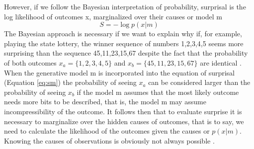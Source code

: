 \documentclass[11pt, onecolumn]{article}
\begin{document}
However, if we follow the Bayesian interpretation of probability, surprisal is the log likelihood of outcomes x,  marginalized over their causes or model m
\begin{equation}
S = -\log p(x|m)
\label{eq:sm}
\end{equation}
The Bayesian approach is necessary if we want to explain why if, for example, playing the state lottery, the winner sequence of numbers 1,2,3,4,5 seems more surprising than the sequence 45,11,23,15,67 despite the fact that the probability of both outcomes $x_a=\{1,2,3,4,5\}$ and $x_b=\{45,11,23,15,67\}$ are identical \cite{palm_novelty_2012}. When the generative model m is incorporated into the equation of surprisal (Equation \ref{eq:sm}) the probability of seeing $x_a$ can be considered larger than  the probability of seeing $x_b$ if the model m assumes that the most likely outcome needs more bits to be described, that is, the model m may assume incompressibility of the outcome. It follows then that to evaluate surprise it is necessary to marginalize over the hidden causes of outcomes, that is to say, we need to calculate the likelihood of the outcomes given the causes or $p(x|m)$. Knowing the causes of observations is obviously not always possible \citep{gomez-ramirez_dont_2013}. 
\end{document}
